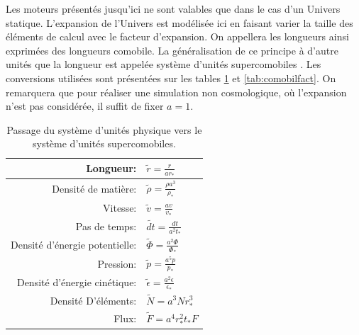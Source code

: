 Les moteurs présentés jusqu'ici ne sont valables que dans le cas d'un Univers statique.
L'expansion de l'Univers est modélisée ici en faisant varier la taille des éléments de calcul avec le facteur d'expansion.
On appellera les longueurs ainsi exprimées des longueurs comobile.
%
La généralisation de ce principe à d'autre unités que la longueur est appelée système d'unités supercomobiles \citep{martel_convenient_1998}.
Les conversions utilisées sont présentées sur les tables \ref{tab:comobil} et \ref{tab:comobilfact}.
On remarquera que pour réaliser une simulation non cosmologique, où l'expansion n'est pas considérée, il suffit de fixer $a=1$.

\begin{table}
\begin{center}
\begin{tabular}{r l} \hline 
Longueur: & $\tilde{r}=\frac{r}{ar_*}$ \\ \hline 
Densité de matière: & $\tilde{\rho}=\frac{\rho a^3}{\rho_*}$ \\ \hline 
Vitesse: & $ \tilde{v}=\frac{av}{v_*}$ \\ \hline 
Pas de temps: & $\tilde{dt}=\frac{dt}{a^2t_*}$\\ \hline 
Densité d’énergie potentielle: & $\tilde{\Phi}=\frac{a^2 \Phi}{\Phi_*}$\\ \hline 
Pression: & $\tilde{p}=\frac{a^5 p}{p_*}$\\ \hline 
Densité d’énergie cinétique: & $\tilde{\epsilon}=\frac{a^2 \epsilon}{\epsilon_*}$\\ \hline 
Densité D’éléments: & $\tilde{N}=a^3 N r_*^3$\\ \hline 
Flux: & $\tilde{F}=a^4 r_*^2 t_* F$\\ \hline 
\end{tabular} 
\end{center}
\caption[Système d'unité supercomobile]{Passage du système d'unités physique vers le système d'unités supercomobiles.
\label{tab:comobil}
} 
\end{table}


